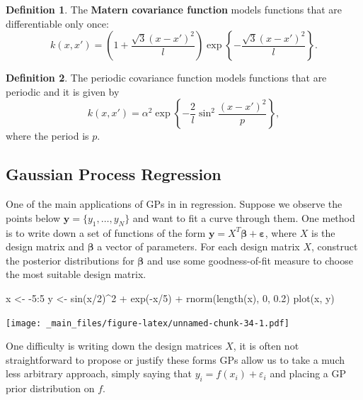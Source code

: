 \documentclass[
]{book}
\newenvironment{Shaded}{\begin{snugshade}}{\end{snugshade}}
\newcommand{\DecValTok}[1]{\textcolor[rgb]{0.00,0.00,0.81}{#1}}
\newcommand{\FloatTok}[1]{\textcolor[rgb]{0.00,0.00,0.81}{#1}}
\newcommand{\FunctionTok}[1]{\textcolor[rgb]{0.00,0.00,0.00}{#1}}
\newcommand{\NormalTok}[1]{#1}
\newcommand{\OtherTok}[1]{\textcolor[rgb]{0.56,0.35,0.01}{#1}}
\newcommand{\SpecialCharTok}[1]{\textcolor[rgb]{0.00,0.00,0.00}{#1}}
\theoremstyle{definition}
\newtheorem{definition}{Definition}[chapter]
\theoremstyle{definition}
\theoremstyle{definition}
\theoremstyle{definition}
\theoremstyle{remark}
\begin{document}
\begin{definition}
The \textbf{M\textquotesingle atern covariance function} models functions that are differentiable only once:
\[
k(x, x') = \left(1 + \frac{\sqrt{3}(x - x')^2}{l} \right)\exp\left\{-\frac{\sqrt{3}(x - x')^2}{l} \right\}.
\]
\end{definition}

\begin{definition}
The periodic covariance function models functions that are periodic and it is given by
\[
k(x, x') = \alpha^2 \exp\left\{-\frac{2}{l}\sin^2\frac{(x-x')^2}{p} \right\},
\]
where the period is \(p\).
\end{definition}

\hypertarget{gaussian-process-regression}{%
\subsection{Gaussian Process Regression}\label{gaussian-process-regression}}

One of the main applications of GPs in in regression. Suppose we observe the points below \(\boldsymbol{y} = \{y_1, \ldots, y_N\}\) and want to fit a curve through them. One method is to write down a set of functions of the form \(\boldsymbol{y} = X^T\boldsymbol{\beta} + \boldsymbol{\varepsilon}\), where \(X\) is the design matrix and \(\boldsymbol{\beta}\) a vector of parameters. For each design matrix \(X\), construct the posterior distributions for \(\boldsymbol{\beta}\) and use some goodness-of-fit measure to choose the most suitable design matrix.

\begin{Shaded}
\begin{Highlighting}[]
\NormalTok{x }\OtherTok{\textless{}{-}} \SpecialCharTok{{-}}\DecValTok{5}\SpecialCharTok{:}\DecValTok{5}
\NormalTok{y }\OtherTok{\textless{}{-}} \FunctionTok{sin}\NormalTok{(x}\SpecialCharTok{/}\DecValTok{2}\NormalTok{)}\SpecialCharTok{\^{}}\DecValTok{2} \SpecialCharTok{+} \FunctionTok{exp}\NormalTok{(}\SpecialCharTok{{-}}\NormalTok{x}\SpecialCharTok{/}\DecValTok{5}\NormalTok{) }\SpecialCharTok{+} \FunctionTok{rnorm}\NormalTok{(}\FunctionTok{length}\NormalTok{(x), }\DecValTok{0}\NormalTok{, }\FloatTok{0.2}\NormalTok{)}
\FunctionTok{plot}\NormalTok{(x, y)}
\end{Highlighting}
\end{Shaded}

\texttt{[image: \_main\_files/figure-latex/unnamed-chunk-34-1.pdf]}

One difficulty is writing down the design matrices \(X\), it is often not straightforward to propose or justify these forms GPs allow us to take a much less arbitrary approach, simply saying that \(y_i = f(x_i) + \varepsilon_i\) and placing a GP prior distribution on \(f\).
\end{document}
